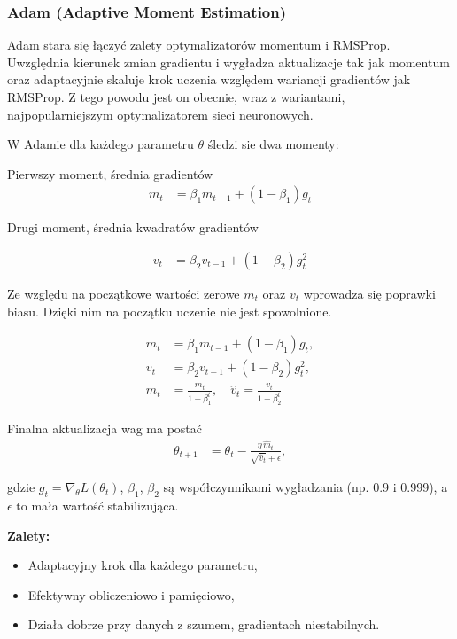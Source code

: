 \subsubsection*{Adam (Adaptive Moment Estimation)}

Adam stara się łączyć zalety optymalizatorów momentum i RMSProp. Uwzględnia kierunek zmian gradientu i wygładza aktualizacje tak jak momentum oraz adaptacyjnie skaluje krok uczenia względem wariancji gradientów jak RMSProp.
Z tego powodu jest on obecnie, wraz z wariantami, najpopularniejszym optymalizatorem sieci neuronowych. 

W Adamie dla każdego parametru  $\theta$ śledzi sie dwa momenty:

Pierwszy moment, średnia gradientów
\[
\begin{aligned}	
	m_t &= \beta_1 m_{t-1} + (1 - \beta_1) g_t
\end{aligned}
\]

Drugi moment, średnia kwadratów gradientów
	
\[
\begin{aligned}	
	v_t &= \beta_2 v_{t-1} + (1 - \beta_2) g_t^2
\end{aligned}
\]

Ze względu na początkowe wartości zerowe $m_t$ oraz $v_t$ wprowadza się poprawki biasu. Dzięki nim na początku uczenie nie jest spowolnione. 

\[
\begin{aligned}
	m_t &= \beta_1 m_{t-1} + (1 - \beta_1) g_t,\\
	v_t &= \beta_2 v_{t-1} + (1 - \beta_2) g_t^2,\\
	\hat{m}_t &= \tfrac{m_t}{1 - \beta_1^t},\quad
	\hat{v}_t = \tfrac{v_t}{1 - \beta_2^t}
\end{aligned}
\]

Finalna aktualizacja wag ma postać
\[
\begin{aligned}
	\theta_{t+1} &= \theta_t - \frac{\eta\,\hat{m}_t}{\sqrt{\hat{v}_t} + \epsilon},
\end{aligned}
\]

gdzie \(g_t = \nabla_{\theta} L(\theta_t)\), \(\beta_1\), \(\beta_2\) są współczynnikami wygładzania (np. 0.9 i 0.999), a \(\epsilon\) to mała wartość stabilizująca.

\textbf{Zalety:}
\begin{itemize}
	\item Adaptacyjny krok dla każdego parametru,
	\item Efektywny obliczeniowo i pamięciowo,
	\item Działa dobrze przy danych z szumem, gradientach niestabilnych.
\end{itemize}


